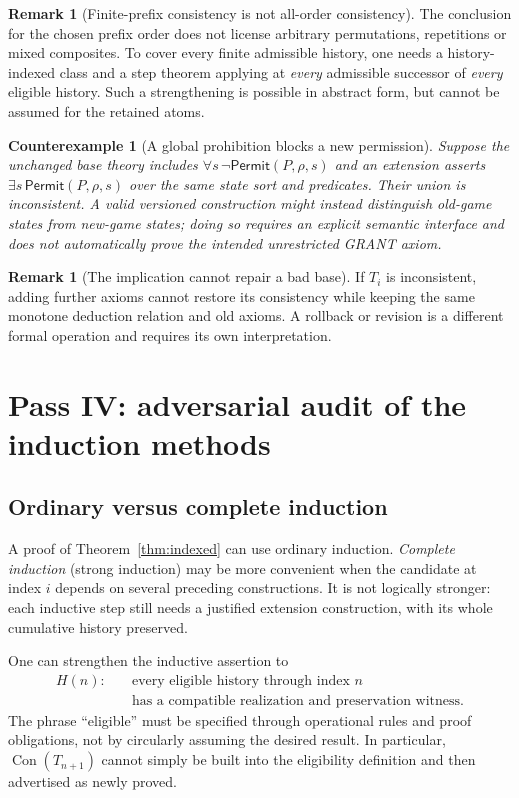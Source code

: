 \documentclass[11pt,letterpaper]{article}
\newtheorem{counterexample}[theorem]{Counterexample}
\theoremstyle{definition}
\newtheorem{remark}[theorem]{Remark}
\newcommand{\Con}{\operatorname{Con}}
\begin{document}
\begin{remark}[Finite-prefix consistency is not all-order consistency]
The conclusion for the chosen prefix order does not license arbitrary permutations, repetitions or mixed composites. To cover every finite admissible history, one needs a history-indexed class and a step theorem applying at \emph{every} admissible successor of \emph{every} eligible history. Such a strengthening is possible in abstract form, but cannot be assumed for the retained atoms.
\end{remark}

\begin{counterexample}[A global prohibition blocks a new permission]
Suppose the unchanged base theory includes \(\forall s\,\neg\mathsf{Permit}(P,\rho,s)\) and an extension asserts \(\exists s\,\mathsf{Permit}(P,\rho,s)\) over the \emph{same} state sort and predicates. Their union is inconsistent. A valid versioned construction might instead distinguish old-game states from new-game states; doing so requires an explicit semantic interface and does not automatically prove the intended unrestricted GRANT axiom.
\end{counterexample}

\begin{remark}[The implication cannot repair a bad base]
If \(T_i\) is inconsistent, adding further axioms cannot restore its consistency while keeping the same monotone deduction relation and old axioms. A rollback or revision is a different formal operation and requires its own interpretation.
\end{remark}

\section{Pass IV: adversarial audit of the induction methods}

\subsection{Ordinary versus complete induction}

A proof of Theorem~\ref{thm:indexed} can use ordinary induction. \emph{Complete induction} (strong induction) may be more convenient when the candidate at index \(i\) depends on several preceding constructions. It is not logically stronger: each inductive step still needs a justified extension construction, with its whole cumulative history preserved.

One can strengthen the inductive assertion to
\[
\begin{aligned}
H(n):\quad &\text{every eligible history through index }n\\
&\text{has a compatible realization and preservation witness.}
\end{aligned}
\]
The phrase ``eligible'' must be specified through operational rules and proof obligations, not by circularly assuming the desired result. In particular, \(\Con(T_{n+1})\) cannot simply be built into the eligibility definition and then advertised as newly proved.
\end{document}
